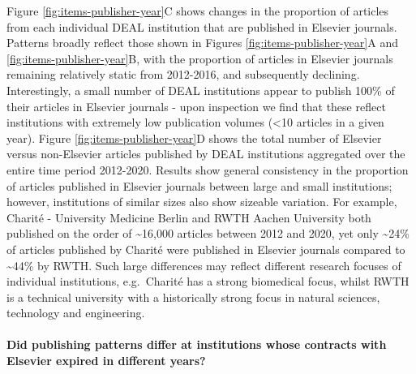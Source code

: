 \documentclass[
]{article}
\begin{document}
Figure \ref{fig:items-publisher-year}C shows changes in the proportion of articles from each individual DEAL institution that are published in Elsevier journals. Patterns broadly reflect those shown in Figures \ref{fig:items-publisher-year}A and \ref{fig:items-publisher-year}B, with the proportion of articles in Elsevier journals remaining relatively static from 2012-2016, and subsequently declining. Interestingly, a small number of DEAL institutions appear to publish 100\% of their articles in Elsevier journals - upon inspection we find that these reflect institutions with extremely low publication volumes (\textless10 articles in a given year). Figure \ref{fig:items-publisher-year}D shows the total number of Elsevier versus non-Elsevier articles published by DEAL institutions aggregated over the entire time period 2012-2020. Results show general consistency in the proportion of articles published in Elsevier journals between large and small institutions; however, institutions of similar sizes also show sizeable variation. For example, Charité - University Medicine Berlin and RWTH Aachen University both published on the order of \textasciitilde16,000 articles between 2012 and 2020, yet only \textasciitilde24\% of articles published by Charité were published in Elsevier journals compared to \textasciitilde44\% by RWTH. Such large differences may reflect different research focuses of individual institutions, e.g.~Charité has a strong biomedical focus, whilst RWTH is a technical university with a historically strong focus in natural sciences, technology and engineering.

\hypertarget{did-publishing-patterns-differ-at-institutions-whose-contracts-with-elsevier-expired-in-different-years}{%
\paragraph{Did publishing patterns differ at institutions whose contracts with Elsevier expired in different years?}\label{did-publishing-patterns-differ-at-institutions-whose-contracts-with-elsevier-expired-in-different-years}}
\end{document}
